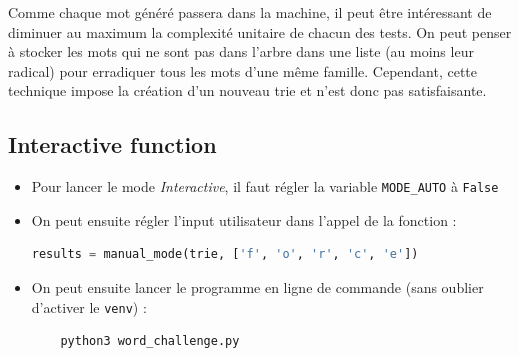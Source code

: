 \documentclass[10pt,a4paper,hidelinks]{article}
\begin{document}
Comme chaque mot généré passera dans la machine, il peut être intéressant de diminuer au maximum la complexité unitaire de chacun des tests. On peut penser à stocker les mots qui ne sont pas dans l'arbre dans une liste (au moins leur radical) pour erradiquer tous les mots d'une même famille. Cependant, cette technique impose la création d'un nouveau trie et n'est donc pas satisfaisante.

\subsection{Interactive function}
\begin{itemize}
    \item Pour lancer le mode \textit{Interactive}, il faut régler la variable \verb|MODE_AUTO| à \verb|False|
    \item On peut ensuite régler l'input utilisateur dans l'appel de la fonction :
    \begin{lstlisting}[language=Python]
    results = manual_mode(trie, ['f', 'o', 'r', 'c', 'e'])
    \end{lstlisting}

    \item On peut ensuite lancer le programme en ligne de commande (sans oublier d'activer le \verb|venv|) :
    \begin{lstlisting}
    python3 word_challenge.py
    \end{lstlisting}
\end{itemize}
\end{document}
